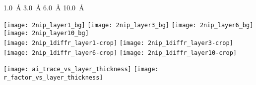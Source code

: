 {              %
    {%
    \begin{minipage}[ ]{.9\colwidth}
        \hspace*{.1225\textwidth}%
        \SI{1.0}{\angstrom}%
        \hfill \SI{3.0}{\angstrom}%
        \hfill \SI{6.0}{\angstrom}%
        \hfill \SI{10.0}{\angstrom}%
        \hspace*{0.1\textwidth}%
        {\ \ \ \ }
      \begin{center}
        \texttt{[image: 2nip\_layer1\_bg]}%
        \texttt{[image: 2nip\_layer3\_bg]}%
        \texttt{[image: 2nip\_layer6\_bg]}%
        \texttt{[image: 2nip\_layer10\_bg]}%
        \\%
        \texttt{[image: 2nip\_1diffr\_layer1-crop]}%
        \texttt{[image: 2nip\_1diffr\_layer3-crop]}%
        \texttt{[image: 2nip\_1diffr\_layer6-crop]}%
        \texttt{[image: 2nip\_1diffr\_layer10-crop]}%
      \end{center}
    \end{minipage}
    }%
    {%
    \begin{minipage}[ ]{.9\colwidth}
      \begin{center}
        \texttt{[image: ai\_trace\_vs\_layer\_thickness]}%
        \texttt{[image: r\_factor\_vs\_layer\_thickness]}%
      \end{center}
    \end{minipage}
    }%
}%
